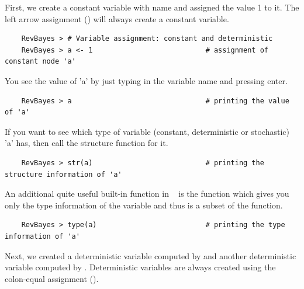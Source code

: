 First, we create a constant variable with name  and assigned the value 1 to it. 
The left arrow assignment (\cl{<-}) will always create a constant variable.
{\tt \begin{snugshade*}
\begin{lstlisting}    
    RevBayes > # Variable assignment: constant and deterministic
    RevBayes > a <- 1                           # assignment of constant node 'a'
\end{lstlisting}
\end{snugshade*}}
You see the value of 'a' by just typing in the variable name and pressing enter.
{\tt \begin{snugshade*}
\begin{lstlisting}    
    RevBayes > a                                # printing the value of 'a'
\end{lstlisting}
\end{snugshade*}}
If you want to see which type of variable (constant, deterministic or stochastic) 'a' has, then call the structure function for it.
{\tt \begin{snugshade*}
\begin{lstlisting}    
    RevBayes > str(a)                           # printing the structure information of 'a'
\end{lstlisting}
\end{snugshade*}}
An additional quite useful built-in function in \RevBayes~ is the  function which gives you only the type information of the variable and thus is a subset of the  function.
{\tt \begin{snugshade*}
\begin{lstlisting}    
    RevBayes > type(a)                          # printing the type information of 'a'
\end{lstlisting}
\end{snugshade*}}

Next, we created a deterministic variable computed by \cl{:=} and another deterministic variable  computed by . 
Deterministic variables are always created using the colon-equal assignment (\cl{:=}). 

